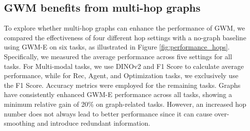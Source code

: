 \begin{table}[!tbp]
\setlength\tabcolsep{3pt}
\centering
\begin{footnotesize}
\caption{\textbf{Planning and optimization results on ALFWorld}. It is to evaluate how well the methods can imitate the trajectory of expert strategies to effectively assist in solving optimization problems. Compared to classic LLM baselines and text generation baselines, GWM-E has achieved the best results.} %
\label{tab:Planning and optimization}
\end{footnotesize}
\end{table}




\subsection{GWM benefits from multi-hop graphs} 


To explore whether multi-hop graphs can enhance the performance of GWM, we compared the effectiveness of four different hop settings with a no-graph baseline using GWM-E on six tasks, as illustrated in Figure \ref{fig:performance_hops}. Specifically, we measured the average performance across five settings for all tasks. For Multi-modal tasks, we use DINOv2 and F1 Score to calculate average performance, while for Rec, Agent, and Optimization tasks, we exclusively use the F1 Score. Accuracy metrics were employed for the remaining tasks. Graphs have consistently enhanced GWM-E performance across all tasks, showing a minimum relative gain of 20\% on graph-related tasks. However, an increased hop number does not always lead to better performance since it can cause over-smoothing and introduce redundant information.

